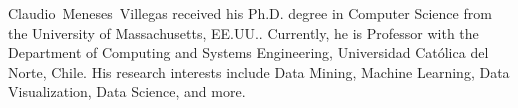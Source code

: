 \documentclass[journal]{IEEEtran}
\begin{document}
\begin{IEEEbiography}{Claudio~Meneses~Villegas}
received his Ph.D. degree in Computer Science from the University of Massachusetts, EE.UU.. Currently, he is Professor with the Department of Computing and Systems Engineering, Universidad Católica del Norte, Chile. His research interests include Data Mining, Machine Learning, Data Visualization, Data Science, and more.
\end{IEEEbiography}






\end{document}
